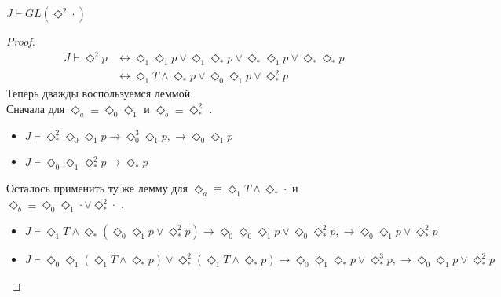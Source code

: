 \documentclass[12pt,a4paper,oneside]{article} \usepackage[left=2cm, right=2cm, top=1.3cm, bottom=2cm]{geometry}
\begin{document}
  \begin{proposition}
    $J \vdash  GL(\Diamond ^2\cdot)$
  \end{proposition}
  \begin{proof}
    \begin{align*}
      J \vdash  \Diamond ^2 p &\leftrightarrow  \Diamond_1 \Diamond_1 p \vee  \Diamond_1 \Diamond_* p \vee  \Diamond_* \Diamond_1 p \vee  \Diamond_* \Diamond_* p\\
      &\leftrightarrow  \Diamond_1 T \wedge  \Diamond_* p \vee  \Diamond_0 \Diamond_1 p \vee  \Diamond_* ^2 p 
    \end{align*}
    Теперь дважды воспользуемся леммой. \\
    Сначала для  $\Diamond_a  \equiv \Diamond_0 \Diamond_1 $  и  $\Diamond_b  \equiv \Diamond_* ^2$ .
    \begin{itemize}
      \item $J \vdash  \Diamond_* ^2\Diamond_0 \Diamond_1 p \rightarrow  \Diamond_0 ^3\Diamond_1 p, \rightarrow  \Diamond_0 \Diamond_1 p$
      \item $J \vdash  \Diamond_0 \Diamond_1 \Diamond_* ^2 p \rightarrow  \Diamond_* p$
    \end{itemize}
    Осталось применить ту же лемму для  $\Diamond_a  \equiv \Diamond_1 T \wedge  \Diamond_* \cdot$  и 
    $\Diamond_b  \equiv \Diamond_0 \Diamond_1 \cdot \vee  \Diamond_* ^2\cdot$ .
    \begin{itemize}
      \item $J \vdash  \Diamond_1 T \wedge  \Diamond_* (\Diamond_0 \Diamond_1 p \vee  \Diamond_* ^2 p) \rightarrow  \Diamond_0 \Diamond_0 \Diamond_1 p \vee  \Diamond_0 \Diamond_* ^2 p, \rightarrow  \Diamond_0 \Diamond_1 p \vee  \Diamond_* ^2 p$
      \item $J \vdash  \Diamond_0 \Diamond_1 (\Diamond_1 T \wedge  \Diamond_* p) \vee  \Diamond_* ^2 (\Diamond_1 T \wedge  \Diamond_* p) \rightarrow  \Diamond_0 \Diamond_1 \Diamond_* p \vee  \Diamond_* ^3 p, \rightarrow  \Diamond_0 \Diamond_1 p \vee  \Diamond_* ^2 p$
    \end{itemize}
  \end{proof}
  
\end{document}
